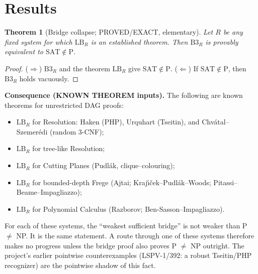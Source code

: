 \documentclass[11pt]{article}
\newtheorem{theorem}{Theorem}
\begin{document}
\section{Results}
\begin{theorem}[Bridge collapse; PROVED/EXACT, elementary]
Let $R$ be any fixed system for which $\mathrm{LB}_R$ is an established theorem.
Then $\mathrm{B3}_R$ is provably equivalent to $\mathrm{SAT}\notin\mathrm P$.
\end{theorem}
\begin{proof}
($\Rightarrow$) $\mathrm{B3}_R$ and the theorem $\mathrm{LB}_R$ give $\mathrm{SAT}\notin\mathrm P$.
($\Leftarrow$) If $\mathrm{SAT}\notin\mathrm P$, then $\mathrm{B3}_R$ holds vacuously.
\end{proof}
\noindent\textbf{Consequence (KNOWN THEOREM inputs).} The following are known
theorems for unrestricted DAG proofs:
\begin{itemize}
\item $\mathrm{LB}_R$ for Resolution: Haken (PHP), Urquhart (Tseitin), and Chv\'atal--Szemer\'edi (random 3-CNF);
\item $\mathrm{LB}_R$ for tree-like Resolution;
\item $\mathrm{LB}_R$ for Cutting Planes (Pudl\'ak, clique--colouring);
\item $\mathrm{LB}_R$ for bounded-depth Frege (Ajtai; Kraj\'\i\v{c}ek--Pudl\'ak--Woods; Pitassi--Beame--Impagliazzo);
\item $\mathrm{LB}_R$ for Polynomial Calculus (Razborov; Ben-Sasson--Impagliazzo).
\end{itemize}
For each of these systems, the ``weakest sufficient bridge'' is not weaker than P $\neq$ NP. It
is the same statement. A route through one of these systems therefore makes no
progress unless the bridge proof also proves P $\neq$ NP outright. The
project's earlier pointwise counterexamples (LSPV-1/392: a robust Tseitin/PHP
recognizer) are the pointwise shadow of this fact.
\end{document}
